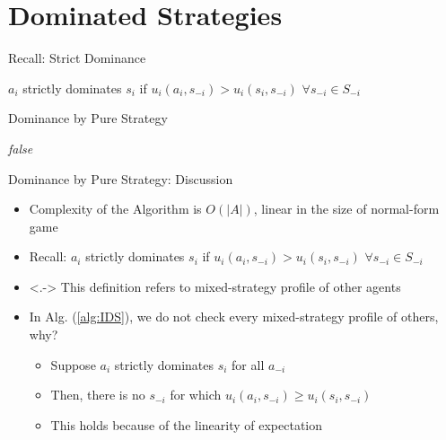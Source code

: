 \documentclass[11pt,aspectratio=169,handout]{beamer}
\begin{document}
 \section{Dominated Strategies}
  
  \begin{frame}{Recall: Strict Dominance}
   \begin{center}
    $a_i$ \alert{strictly dominates} $s_i$ if $u_i(a_i, s_{-i}) > u_i(s_i,s_{-i})$ $\forall s_{-i} \in S_{-i}$
   \end{center}
  \end{frame}
  
  
  \begin{frame}{Dominance by Pure Strategy}
   \begin{algorithm*}[H]
    \Return \textit{false}\;
   \label{alg:IDS}
   \caption{Determine whether $s_i$ is strictly dominated by any pure strategy}
   \end{algorithm*}
  \end{frame}
  
    
  \begin{frame}{Dominance by Pure Strategy: Discussion}
   \begin{itemize}[<+->]
   \setlength{\itemsep}{1.2em}
    \item Complexity of the Algorithm is $O(\vert A\vert)$, linear in the size of normal-form game
    \item Recall: $a_i$ \alert{strictly dominates} $s_i$ if $u_i(a_i, s_{-i}) > u_i(s_i,s_{-i})$ $\forall s_{-i} \in S_{-i}$
    \item<.-> This definition refers to mixed-strategy profile of other agents
    \item In Alg. (\ref{alg:IDS}), we do not check every mixed-strategy profile of others, why?
    \begin{itemize}
    \setlength{\itemsep}{0.8em}
     \item Suppose $a_i$ strictly dominates $s_i$ for all $a_{-i}$
     \item Then, there is no $s_{-i}$ for which $u_i(a_i, s_{-i}) \ge u_i(s_i, s_{-i})$
     \item This holds because of the linearity of expectation
    \end{itemize}
   \end{itemize}
  \end{frame}
  
\end{document}
